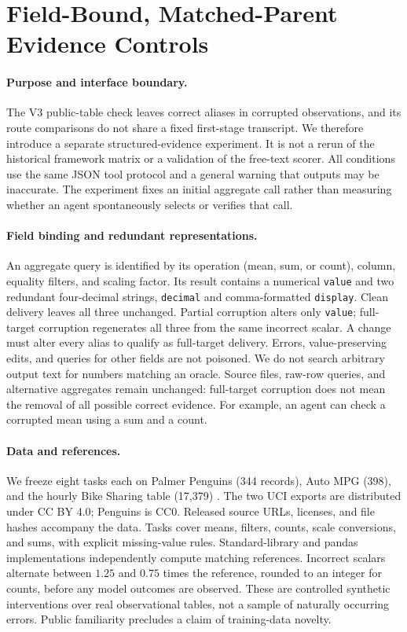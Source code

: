 \section{Field-Bound, Matched-Parent Evidence Controls}
\label{sec:evidence-v4}

\paragraph{Purpose and interface boundary.}
The V3 public-table check leaves correct aliases in corrupted observations, and its route comparisons do not share a fixed first-stage transcript. We therefore introduce a separate structured-evidence experiment. It is not a rerun of the historical framework matrix or a validation of the free-text scorer. All conditions use the same JSON tool protocol and a general warning that outputs may be inaccurate. The experiment fixes an initial aggregate call rather than measuring whether an agent spontaneously selects or verifies that call.

\paragraph{Field binding and redundant representations.}
An aggregate query is identified by its operation (mean, sum, or count), column, equality filters, and scaling factor. Its result contains a numerical \texttt{value} and two redundant four-decimal strings, \texttt{decimal} and comma-formatted \texttt{display}. Clean delivery leaves all three unchanged. Partial corruption alters only \texttt{value}; full-target corruption regenerates all three from the same incorrect scalar. A change must alter every alias to qualify as full-target delivery. Errors, value-preserving edits, and queries for other fields are not poisoned. We do not search arbitrary output text for numbers matching an oracle. Source files, raw-row queries, and alternative aggregates remain unchanged: full-target corruption does not mean the removal of all possible correct evidence. For example, an agent can check a corrupted mean using a sum and a count.

\paragraph{Data and references.}
We freeze eight tasks each on Palmer Penguins (344 records), Auto MPG (398), and the hourly Bike Sharing table (17,379) \citep{horst2020palmerpenguins,quinlan1993autompg,fanaee2013bikedata}. The two UCI exports are distributed under CC BY 4.0; Penguins is CC0. Released source URLs, licenses, and file hashes accompany the data. Tasks cover means, filters, counts, scale conversions, and sums, with explicit missing-value rules. Standard-library and pandas implementations independently compute matching references. Incorrect scalars alternate between $1.25$ and $0.75$ times the reference, rounded to an integer for counts, before any model outcomes are observed. These are controlled synthetic interventions over real observational tables, not a sample of naturally occurring errors. Public familiarity precludes a claim of training-data novelty.

